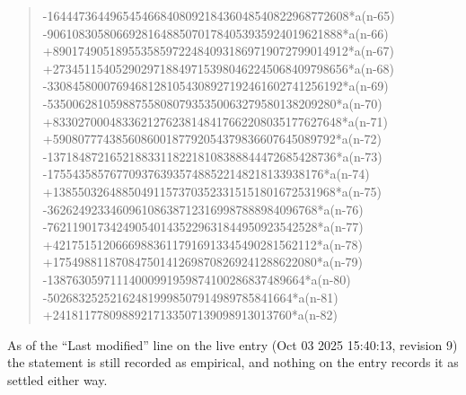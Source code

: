 \documentclass[11pt,a4paper]{article}
\theoremstyle{plain}
\theoremstyle{definition}
\begin{document}
\begin{quote}
-164447364496545466840809218436048540822968772608*a(n-65) -90610830580669281648850701784053935924019621888*a(n-66) +89017490518955358597224840931869719072799014912*a(n-67) +27345115405290297188497153980462245068409798656*a(n-68) -33084580007694681281054308927192461602741256192*a(n-69) -5350062810598875580807935350063279580138209280*a(n-70) +8330270004833621276238148417662208035177627648*a(n-71) +590807774385608600187792054379836607645089792*a(n-72) -1371848721652188331182218108388844472685428736*a(n-73) -17554358576770937639357488522148218133938176*a(n-74) +138550326488504911573703523315151801672531968*a(n-75) -3626249233460961086387123169987888984096768*a(n-76) -7621190173424905401435229631844950923542528*a(n-77) +421751512066698836117916913345490281562112*a(n-78) +175498811870847501412698708269241288622080*a(n-79) -13876305971114000991959874100286837489664*a(n-80) -502683252521624819998507914989785841664*a(n-81) +24181177809889217133507139098913013760*a(n-82)
\end{quote}
As of the ``Last modified'' line on the live entry (Oct 03 2025 15:40:13, revision 9) the statement is
still recorded as empirical, and nothing on the entry records it as settled either way.
\end{document}
